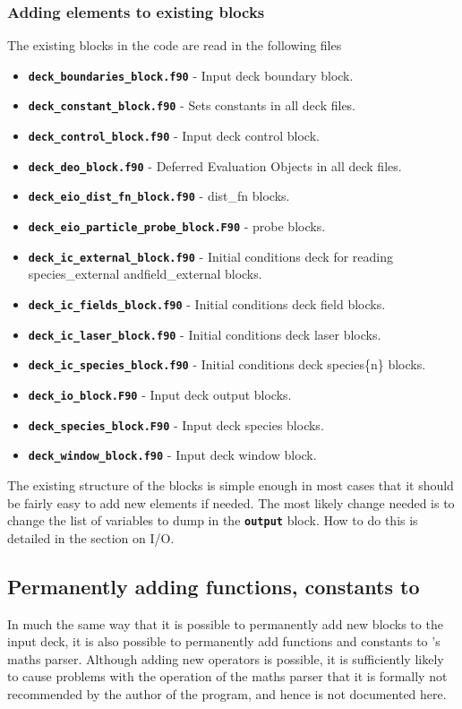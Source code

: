 \documentclass[12pt,a4paper]{article}
\newcommand{\inlinecode}[1]{{\color{warwickred} \bf\texttt{#1}}}
\newcommand{\EPOCH}{{\color{warwickdark}\fontfamily{phv}\selectfont{EPOCH}}}
\begin{document}
\subsubsection{Adding elements to existing blocks}
The existing blocks in the code are read in the following files
\begin{itemize}
\item \inlinecode{deck\_boundaries\_block.f90} - Input deck boundary block.
\item \inlinecode{deck\_constant\_block.f90} - Sets constants in all deck files.
\item \inlinecode{deck\_control\_block.f90} - Input deck control block.
\item \inlinecode{deck\_deo\_block.f90} - Deferred Evaluation Objects in all
  deck files.
\item \inlinecode{deck\_eio\_dist\_fn\_block.f90} - dist\_fn blocks.
\item \inlinecode{deck\_eio\_particle\_probe\_block.F90} - probe blocks.
\item \inlinecode{deck\_ic\_external\_block.f90} - Initial conditions deck for
  reading species\_external and\linebreak field\_external blocks.
\item \inlinecode{deck\_ic\_fields\_block.f90} - Initial conditions deck field
  blocks.
\item \inlinecode{deck\_ic\_laser\_block.f90} - Initial conditions deck laser
  blocks.
\item \inlinecode{deck\_ic\_species\_block.f90} - Initial conditions deck
  species\{n\} blocks.
\item \inlinecode{deck\_io\_block.F90} - Input deck output blocks.
\item \inlinecode{deck\_species\_block.F90} - Input deck species blocks.
\item \inlinecode{deck\_window\_block.f90} - Input deck window block.
\end{itemize}

The existing structure of the blocks is simple enough in most cases that it
should be fairly easy to add new elements if needed. The most likely change
needed is to change the list of variables to dump in the \inlinecode{output}
block. How to do this is detailed in the section on {\EPOCH} I/O.

\subsection{Permanently adding functions, constants to {\EPOCH}}
In much the same way that it is possible to permanently add new blocks to the
input deck, it is also possible to permanently add functions and constants to
{\EPOCH}'s maths parser. Although adding new operators is possible, it is
sufficiently likely to cause problems with the operation of the maths parser
that it is formally not recommended by the author of the program, and hence is
not documented here.
\end{document}
